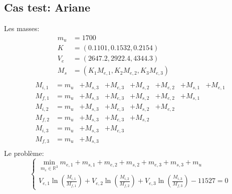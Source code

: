 \documentclass[a4paper,20pt]{article}
\begin{document}
\subsection{Cas test: Ariane}
Les masses:
\begin{align*}
m_u &= 1700 & & & & & & \\
K &= (0.1101, 0.1532, 0.2154) & & & & & & \\
V_e &= (2647.2, 2922.4, 4344.3) & & & & & & \\
M_s &= (K_1M_{e,1}, K_2M_{e,2}, K_3M_{e,3}) & & & & & & \\
\end{align*}
\begin{align*}
M_{i,1} &= m_u &+ M_{s,3} &+ M_{e,3} &+ M_{s,2} &+ M_{e,2} &+ M_{s,1} &+ M_{e,1}
 \\
M_{f,1} &= m_u &+ M_{s,3} &+ M_{e,3} &+ M_{s,2} &+ M_{e,2} &+ M_{s,1} & \\
M_{i,2} &= m_u &+ M_{s,3} &+ M_{e,3} &+ M_{s,2} &+ M_{e,2} & & \\
M_{f,2} &= m_u &+ M_{s,3} &+ M_{e,3} &+ M_{s,2} & & & \\
M_{i,3} &= m_u &+ M_{s,3} &+ M_{e,3} & & & & \\
M_{f,3} &= m_u &+ M_{s,3} & & & & & \\
\end{align*}
Le probl\`eme:
\begin{equation*}
\begin{cases}
\min\limits_{m_e\in\mathbb{R}^3}{m_{e,1}+m_{s,1}+m_{e,2}+m_{s,2}+m_{e,3}+m_{s,3}
+m_u} \\
V_{e,1}\ln\left(\frac{M_{i,1}}{M_{f,1}}\right)
+V_{e,2}\ln\left(\frac{M_{i,2}}{M_{f,2}}\right)
+V_{e,3}\ln\left(\frac{M_{i,3}}{M_{f,3}}\right)-11527=0
\end{cases}
\end{equation*}
\end{document}
